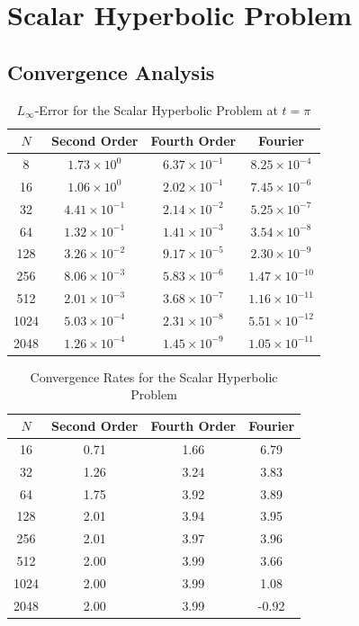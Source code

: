 \section{Scalar Hyperbolic Problem}
\subsection{Convergence Analysis}
\begin{table}[H]
	\centering
	\begin{tabular}{|c|c|c|c|}
		\hline
		$N$  & Second Order          & Fourth Order          & Fourier                \\
		\hline
		8    & $1.73 \times 10^{0}$  & $6.37 \times 10^{-1}$ & $8.25 \times 10^{-4}$  \\
		16   & $1.06 \times 10^{0}$  & $2.02 \times 10^{-1}$ & $7.45 \times 10^{-6}$  \\
		32   & $4.41 \times 10^{-1}$ & $2.14 \times 10^{-2}$ & $5.25 \times 10^{-7}$  \\
		64   & $1.32 \times 10^{-1}$ & $1.41 \times 10^{-3}$ & $3.54 \times 10^{-8}$  \\
		128  & $3.26 \times 10^{-2}$ & $9.17 \times 10^{-5}$ & $2.30 \times 10^{-9}$  \\
		256  & $8.06 \times 10^{-3}$ & $5.83 \times 10^{-6}$ & $1.47 \times 10^{-10}$ \\
		512  & $2.01 \times 10^{-3}$ & $3.68 \times 10^{-7}$ & $1.16 \times 10^{-11}$ \\
		1024 & $5.03 \times 10^{-4}$ & $2.31 \times 10^{-8}$ & $5.51 \times 10^{-12}$ \\
		2048 & $1.26 \times 10^{-4}$ & $1.45 \times 10^{-9}$ & $1.05 \times 10^{-11}$ \\
		\hline
	\end{tabular}
	\caption{$L_{\infty}$-Error for the Scalar Hyperbolic Problem at $t = \pi$}
	\label{tab:hyperbolic_error}
\end{table}

\begin{table}[H]
	\centering
	\begin{tabular}{|c|c|c|c|}
		\hline
		$N$  & Second Order & Fourth Order & Fourier \\
		\hline
		16   & 0.71         & 1.66         & 6.79    \\
		32   & 1.26         & 3.24         & 3.83    \\
		64   & 1.75         & 3.92         & 3.89    \\
		128  & 2.01         & 3.94         & 3.95    \\
		256  & 2.01         & 3.97         & 3.96    \\
		512  & 2.00         & 3.99         & 3.66    \\
		1024 & 2.00         & 3.99         & 1.08    \\
		2048 & 2.00         & 3.99         & -0.92   \\
		\hline
	\end{tabular}
	\caption{Convergence Rates for the Scalar Hyperbolic Problem}
	\label{tab:hyperbolic_rates}
\end{table}

